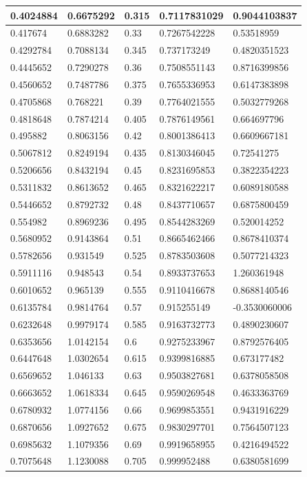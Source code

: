 \documentclass[coverpage]{article}
\begin{document}
\begin{table}[!ht]
\begin{tabular}{|l|l|l|l|l|}
			0.4024884 & 0.6675292 & 0.315 & 0.7117831029 & 0.9044103837 \\ \hline
			0.417674 & 0.6883282 & 0.33 & 0.7267542228 & 0.53518959 \\ \hline
			0.4292784 & 0.7088134 & 0.345 & 0.737173249 & 0.4820351523 \\ \hline
			0.4445652 & 0.7290278 & 0.36 & 0.7508551143 & 0.8716399856 \\ \hline
			0.4560652 & 0.7487786 & 0.375 & 0.7655336953 & 0.6147383898 \\ \hline
			0.4705868 & 0.768221 & 0.39 & 0.7764021555 & 0.5032779268 \\ \hline
			0.4818648 & 0.7874214 & 0.405 & 0.7876149561 & 0.664697796 \\ \hline
			0.495882 & 0.8063156 & 0.42 & 0.8001386413 & 0.6609667181 \\ \hline
			0.5067812 & 0.8249194 & 0.435 & 0.8130346045 & 0.72541275 \\ \hline
			0.5206656 & 0.8432194 & 0.45 & 0.8231695853 & 0.3822354223 \\ \hline
			0.5311832 & 0.8613652 & 0.465 & 0.8321622217 & 0.6089180588 \\ \hline
			0.5446652 & 0.8792732 & 0.48 & 0.8437710657 & 0.6875800459 \\ \hline
			0.554982 & 0.8969236 & 0.495 & 0.8544283269 & 0.520014252 \\ \hline
			0.5680952 & 0.9143864 & 0.51 & 0.8665462466 & 0.8678410374 \\ \hline
			0.5782656 & 0.931549 & 0.525 & 0.8783503608 & 0.5077214323 \\ \hline
			0.5911116 & 0.948543 & 0.54 & 0.8933737653 & 1.260361948 \\ \hline
			0.6010652 & 0.965139 & 0.555 & 0.9110416678 & 0.8688140546 \\ \hline
			0.6135784 & 0.9814764 & 0.57 & 0.915255149 & -0.3530060006 \\ \hline
			0.6232648 & 0.9979174 & 0.585 & 0.9163732773 & 0.4890230607 \\ \hline
			0.6353656 & 1.0142154 & 0.6 & 0.9275233967 & 0.8792576405 \\ \hline
			0.6447648 & 1.0302654 & 0.615 & 0.9399816885 & 0.673177482 \\ \hline
			0.6569652 & 1.046133 & 0.63 & 0.9503827681 & 0.6378058508 \\ \hline
			0.6663652 & 1.0618334 & 0.645 & 0.9590269548 & 0.4633363769 \\ \hline
			0.6780932 & 1.0774156 & 0.66 & 0.9699853551 & 0.9431916229 \\ \hline
			0.6870656 & 1.0927652 & 0.675 & 0.9830297701 & 0.7564507123 \\ \hline
			0.6985632 & 1.1079356 & 0.69 & 0.9919658955 & 0.4216494522 \\ \hline
			0.7075648 & 1.1230088 & 0.705 & 0.999952488 & 0.6380581699 \\ \hline
		\end{tabular}
	\end{table}
	
\end{document}
